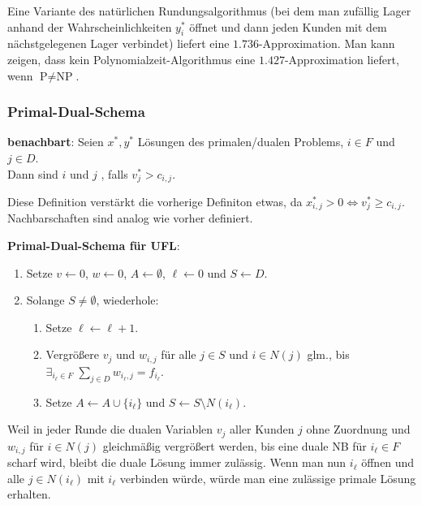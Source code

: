 \linie

Eine Variante des natürlichen Rundungsalgorithmus
(bei dem man zufällig Lager anhand der Wahrscheinlichkeiten $y_i^\ast$ öffnet und dann
jeden Kunden mit dem nächstgelegenen Lager verbindet)
liefert eine $1.736$-Approximation.
Man kann zeigen, dass kein Polynomialzeit-Algorithmus eine $1.427$-Approximation liefert,
wenn $\text{P} \not= \text{NP}$.

\pagebreak

\subsubsection{%
    Primal-Dual-Schema%
}

\textbf{benachbart}:
Seien $x^\ast, y^\ast$ Lösungen des primalen/dualen Problems, $i \in F$ und $j \in D$.\\
Dann sind $i$ und $j$ , falls $v_j^\ast > c_{i,j}$.

Diese Definition verstärkt die vorherige Definiton etwas, da
$x_{i,j}^\ast > 0 \iff v_j^\ast \ge c_{i,j}$.\\
Nachbarschaften sind analog wie vorher definiert.

\linie

\textbf{Primal-Dual-Schema für UFL}:
\begin{enumerate}
    \item
    Setze $v \leftarrow 0$,
    $w \leftarrow 0$,
    $A \leftarrow \emptyset$,
    $\ell \leftarrow 0$ und
    $S \leftarrow D$.

    \item
    Solange $S \not= \emptyset$, wiederhole:
    \begin{enumerate}
        \item
        Setze $\ell \leftarrow \ell + 1$.

        \item
        Vergrößere $v_j$ und $w_{i,j}$ für alle $j \in S$ und $i \in N(j)$ glm.,
        bis $\exists_{i_\ell \in F}\; \sum_{j \in D} w_{i_\ell,j} = f_{i_\ell}$.

        \item
        Setze $A \leftarrow A \cup \{i_\ell\}$
        und $S \leftarrow S \setminus N(i_\ell)$.
    \end{enumerate}
\end{enumerate}

Weil in jeder Runde die dualen Variablen $v_j$ aller Kunden $j$ ohne Zuordnung
und $w_{i,j}$ für $i \in N(j)$ gleichmäßig vergrößert werden,
bis eine duale NB für $i_\ell \in F$ scharf wird,
bleibt die duale Lösung immer zulässig.
Wenn man nun $i_\ell$ öffnen und alle $j \in N(i_\ell)$ mit $i_\ell$ verbinden würde,
würde man eine zulässige primale Lösung erhalten.

